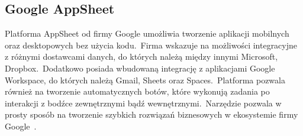 \subsection{Google AppSheet}
Platforma AppSheet od firmy Google umożliwia tworzenie aplikacji mobilnych oraz desktopowych bez użycia kodu.\ Firma wskazuje na możliwości integracyjne z różnymi dostawcami danych, do których należą między innymi Microsoft, Dropbox.\ Dodatkowo posiada wbudowaną integrację z aplikacjami Google Workspace, do których należą Gmail, Sheets oraz Spaces.\ Platforma pozwala również na tworzenie automatycznych botów, które wykonują zadania po interakcji z bodźce zewnętrznymi bądź wewnętrznymi.\ Narzędzie pozwala w prosty sposób na tworzenie szybkich rozwiązań biznesowych w ekosystemie firmy Google~\cite{GoogleAppSheet}.
